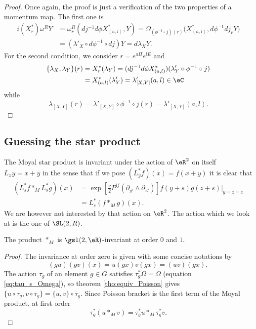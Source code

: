 \begin{proof}
Once again, the proof is just a verification of the two properties of a momentum map. The first one is
\begin{equation}
\begin{split}
  i(X^*_r)\omega^R Y&=\omega^R_r(dj^{-1} d\phi X^*_{(a,l)},Y)
		=\Omega_{(\phi^{-1}\circ j)(r)}\big( X^*_{(a,l)},d\phi^{-1} dj_r Y \big)\\
		&=(\lambda'_X\circ d\phi^{-1}\circ dj)Y
		=d\lambda_X Y.
\end{split}
\end{equation}
For the second condition, we consider $r=e^{aH}e^{lE}$ and
\begin{equation}
\begin{split}
  \{ \lambda_X,\lambda_Y \}(r)&=X^*_r(\lambda_Y)
		=(dj^{-1} d\phi X^*_{(a,l)})(\lambda'_Y\circ \phi^{-1}\circ j)\\
		&=X^*_{(a,l)}(\lambda'_Y)
		=\lambda'_{[X,Y]}(a,l)\in\eC
\end{split}
\end{equation}
while 
\[ 
  \lambda_{[X,Y]}(r)=\lambda'_{[X,Y]}\circ\phi^{-1}\circ j(r)=\lambda'_{[X,Y]}(a,l).
\]
\end{proof}

\subsection{Guessing the star product}

The Moyal star product is invariant under the action of $\eR^2$ on itself $L_xy=x+y$ in the sense that if we pose $(L_y^*f)(x)=f(x+y)$ it is clear that
\begin{equation}
\begin{split}
    (L_s^*f\ast_M L_s^*g)(x)&=
    \exp\left[{\displaystyle\frac{\nu}{2}P^{ij}(\partial_{y^i}\wedge\partial_{z^j})}\right]f(y+s)g(z+s)|_{y=z=x}\\
	                    &=L^*_s(f\ast_M g)(x).
\end{split}
\end{equation}
We are however not interested by that action on $\eR^2$. The action which we look at is the one of $\SL(2,R)$.

\begin{proposition}
The product $\ast_M$ is $\gsl(2,\eR)$-invariant at order $0$ and $1$.
\end{proposition}

\begin{proof}
The invariance at order zero is given with some concise notations by
\[
 (gu)(gv)(x)=u(gx)v(gx)=(uv)(gx),
\]
The action $\tau_g$ of an element $g\in G$ satisfies $\tau_g^*\Omega=\Omega$ (equation \eqref{eq:tau_s_Omega}), so  theorem \ref{tho:equiv_Poisson} gives $\{u\circ\tau_g,v\circ\tau_g\}=\{u,v\}\circ\tau_g$.  Since Poisson bracket is the first term of the Moyal product, at first order
\[
  \tau_g^*(u\ast_M v)=\tau_g^*u\ast_M\tau_g^*v.
\]


\end{proof}

